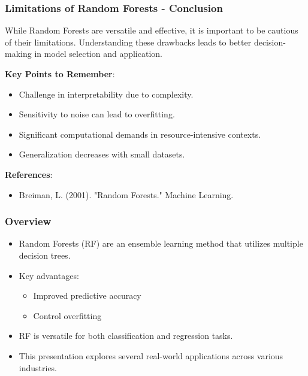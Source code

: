 \documentclass[aspectratio=169]{beamer}
\begin{document}
\begin{frame}[fragile]
    \frametitle{Limitations of Random Forests - Conclusion}
    While Random Forests are versatile and effective, it is important to be cautious of their limitations. Understanding these drawbacks leads to better decision-making in model selection and application.
    
    \textbf{Key Points to Remember}:
    \begin{itemize}
        \item Challenge in interpretability due to complexity.
        \item Sensitivity to noise can lead to overfitting.
        \item Significant computational demands in resource-intensive contexts.
        \item Generalization decreases with small datasets.
    \end{itemize}

    \textbf{References}:
    \begin{itemize}
        \item Breiman, L. (2001). "Random Forests." Machine Learning.
    \end{itemize}
\end{frame}

\begin{frame}[fragile]
    \frametitle{Overview}
    \begin{itemize}
        \item Random Forests (RF) are an ensemble learning method that utilizes multiple decision trees.
        \item Key advantages:
        \begin{itemize}
            \item Improved predictive accuracy
            \item Control overfitting
        \end{itemize}
        \item RF is versatile for both classification and regression tasks.
        \item This presentation explores several real-world applications across various industries.
    \end{itemize}
\end{frame}
\end{document}
